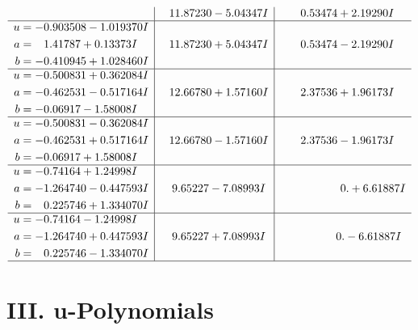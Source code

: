 \documentclass[1p]{elsarticle_modified}
\theoremstyle{definition}
\begin{document}
$$\begin{array}{c|c|c}
 & \phantom{-}11.87230 - 5.04347 I & \phantom{-}0.53474 + 2.19290 I \\ \hline\begin{aligned}
u &= -0.903508 - 1.019370 I \\
a &= \phantom{-}1.41787 + 0.13373 I \\
b &= -0.410945 + 1.028460 I\end{aligned}
 & \phantom{-}11.87230 + 5.04347 I & \phantom{-}0.53474 - 2.19290 I \\ \hline\begin{aligned}
u &= -0.500831 + 0.362084 I \\
a &= -0.462531 - 0.517164 I \\
b &= -0.06917 - 1.58008 I\end{aligned}
 & \phantom{-}12.66780 + 1.57160 I & \phantom{-}2.37536 + 1.96173 I \\ \hline\begin{aligned}
u &= -0.500831 - 0.362084 I \\
a &= -0.462531 + 0.517164 I \\
b &= -0.06917 + 1.58008 I\end{aligned}
 & \phantom{-}12.66780 - 1.57160 I & \phantom{-}2.37536 - 1.96173 I \\ \hline\begin{aligned}
u &= -0.74164 + 1.24998 I \\
a &= -1.264740 - 0.447593 I \\
b &= \phantom{-}0.225746 + 1.334070 I\end{aligned}
 & \phantom{-}9.65227 - 7.08993 I & \phantom{-0.000000 -}0. + 6.61887 I \\ \hline\begin{aligned}
u &= -0.74164 - 1.24998 I \\
a &= -1.264740 + 0.447593 I \\
b &= \phantom{-}0.225746 - 1.334070 I\end{aligned}
 & \phantom{-}9.65227 + 7.08993 I & \phantom{-0.000000 } 0. - 6.61887 I\\
 \hline 
 \end{array}$$\newpage
\newpage\renewcommand{\arraystretch}{1}
\centering \section*{ III. u-Polynomials}
\end{document}

